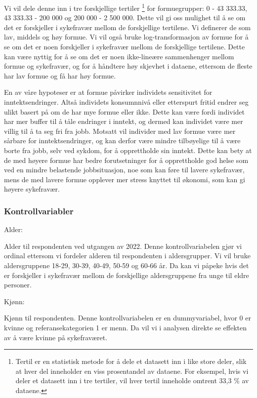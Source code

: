 \documentclass[
  12pt,
  a4paper,
  DIV=11,
  numbers=noendperiod]{scrartcl}
\begin{document}
Vi vil dele denne inn i tre forskjellige tertiler \footnote{Tertil er en
  statistisk metode for å dele et datasett inn i like store deler, slik
  at hver del inneholder en viss prosentandel av dataene. For eksempel,
  hvis vi deler et datasett inn i tre tertiler, vil hver tertil
  inneholde omtrent 33,3 \% av dataene.} for formuegrupper: 0 - 43
333.33, 43 333.33 - 200 000 og 200 000 - 2 500 000. Dette vil gi oss
mulighet til å se om det er forskjeller i sykefravær mellom de
forskjellige tertilene. Vi definerer de som lav, middels og høy formue.
Vi vil også bruke log-transformasjon av formue for å se om det er noen
forskjeller i sykefravær mellom de forskjellige tertilene. Dette kan
være nyttig for å se om det er noen ikke-lineære sammenhenger mellom
formue og sykefravær, og for å håndtere høy skjevhet i dataene, ettersom
de fleste har lav formue og få har høy formue.

En av våre hypoteser er at formue påvirker individets sensitivitet for
inntektsendringer. Altså individets konsumnnivå eller etterspurt fritid
endrer seg ulikt basert på om de har mye formue eller ikke. Dette kan
være fordi individet har mer buffer til å tåle endringer i inntekt, og
dermed kan individet være mer villig til å ta seg fri fra jobb. Motsatt
vil individer med lav formue være mer sårbare for inntektsendringer, og
kan derfor være mindre tilbøyelige til å være borte fra jobb, selv ved
sykdom, for å opprettholde sin inntekt. Dette kan bety at de med høyere
formue har bedre forutsetninger for å opprettholde god helse som ved en
mindre belastende jobbsituasjon, noe som kan føre til lavere sykefravær,
mens de med lavere formue opplever mer stress knyttet til økonomi, som
kan gi høyere sykefravær.

\subsubsection{Kontrollvariabler}\label{kontrollvariabler}

Alder:

Alder til respondenten ved utgangen av 2022. Denne kontrollvariabelen
gjør vi ordinal ettersom vi fordeler alderen til respondenten i
aldersgrupper. Vi vil bruke aldersgruppene 18-29, 30-39, 40-49, 50-59 og
60-66 år. Da kan vi påpeke hvis det er forskjeller i sykefravær mellom
de forskjellige aldersgruppene fra unge til eldre personer.

Kjønn:

Kjønn til respondenten. Denne kontrollvariabelen er en dummyvariabel,
hvor 0 er kvinne og referansekategorien 1 er menn. Da vil vi i analysen
direkte se effekten av å være kvinne på sykefraværet.
\end{document}
